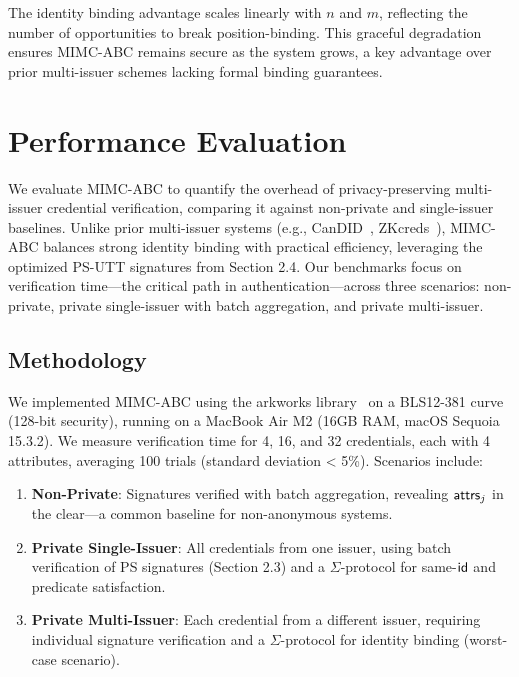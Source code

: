 The identity binding advantage scales linearly with $n$ and $m$, reflecting the number of opportunities to break position-binding. This graceful degradation ensures MIMC-ABC remains secure as the system grows, a key advantage over prior multi-issuer schemes lacking formal binding guarantees.



\section{Performance Evaluation}

We evaluate MIMC-ABC to quantify the overhead of privacy-preserving multi-issuer credential verification, comparing it against non-private and single-issuer baselines. Unlike prior multi-issuer systems (e.g., CanDID~\cite{maram2021candid}, ZKcreds~\cite{rosenberg_zk-creds_2022}), MIMC-ABC balances strong identity binding with practical efficiency, leveraging the optimized PS-UTT signatures from Section 2.4. Our benchmarks focus on verification time—the critical path in authentication—across three scenarios: non-private, private single-issuer with batch aggregation, and private multi-issuer.

\subsection{Methodology}

We implemented MIMC-ABC using the arkworks library~\cite{arkworks_contributors_arkworks_2022} on a BLS12-381 curve (128-bit security), running on a MacBook Air M2 (16GB RAM, macOS Sequoia 15.3.2). We measure verification time for 4, 16, and 32 credentials, each with 4 attributes, averaging 100 trials (standard deviation < 5\%). Scenarios include:
\begin{enumerate}
    \item \textbf{Non-Private}: Signatures verified with batch aggregation, revealing $\mathsf{attrs}_j$ in the clear—a common baseline for non-anonymous systems.
    \item \textbf{Private Single-Issuer}: All credentials from one issuer, using batch verification of PS signatures (Section 2.3) and a $\Sigma$-protocol for same-$\mathsf{id}$ and predicate satisfaction.
    \item \textbf{Private Multi-Issuer}: Each credential from a different issuer, requiring individual signature verification and a $\Sigma$-protocol for identity binding (worst-case scenario).
\end{enumerate}





